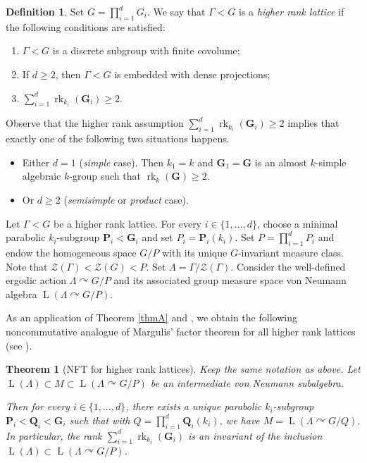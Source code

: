 \documentclass[JEP,XML,SOM,Unicode,published]{cedram}
\newenvironment{enumeratei}
{\bgroup\def\theenumi{\roman{enumi}}\def\theenumii{\arabic{enumii}}\begin{enumerate}}
{\end{enumerate}\egroup}
\newcommand{\bG}{\boldsymbol{G}}
\newcommand{\bP}{\boldsymbol{P}}
\newcommand{\bQ}{\boldsymbol{Q}}
\newtheorem{letterthm}{Theorem}
\theoremstyle{definition}
\newtheorem*{definition}{Definition}
\DeclareMathOperator{\rk}{rk}
\DeclareMathOperator{\rL}{L}
\begin{document}
\begin{definition}
Set $G = \prod_{i = 1}^d G_i$. We say that $\Gamma < G$ is a \emph{higher rank lattice} if the following conditions are satisfied:
\begin{enumeratei}
\item
$\Gamma < G$ is a discrete subgroup with finite covolume;
\item
If $d \geq 2$, then $\Gamma < G$ is embedded with dense projections;
\item
$\sum_{i = 1}^d \rk_{k_i}(\bG_i) \geq 2$.
\end{enumeratei}
\end{definition}

Observe that the higher rank assumption $\sum_{i = 1}^d \rk_{k_i}(\bG_i) \geq 2$ implies that exactly one of the following two situations happens.
\begin{itemize}
\item Either $d = 1$ (\emph{simple} case). Then $k_1 = k$ and $\bG_1 = \bG$ is an almost $k$-simple algebraic $k$-group such that $\rk_k(\bG) \geq 2$.
\item Or $d \geq 2$ (\emph{semisimple} or \emph{product} case).
\end{itemize}

Let $\Gamma < G$ be a higher rank lattice. For every $i \in \{1, \dots, d\}$, choose a minimal parabolic $k_i$-subgroup $\bP_i < \bG_i$ and set $P_i = \bP_i(k_i)$. Set $P = \prod_{i = 1}^d P_i$ and endow the homogeneous space $G/P$ with its unique $G$-invariant measure class. Note that $\mathscr Z(\Gamma) < \mathscr Z(G) < P$. Set $\Lambda = \Gamma/\mathscr Z(\Gamma)$. Consider the well-defined ergodic action $\Lambda \curvearrowright G/P$ and its associated group measure space von Neumann algebra $\rL(\Lambda \curvearrowright G/P)$.

As an application of Theorem \ref{thmA} and \cite[Th.\,D]{BBH21}, we obtain the following noncommutative analogue of Margulis'\! factor theorem for all higher rank lattices (see \cite[Th.\,IV.2.11]{Ma91}).

\begin{letterthm}[NFT for higher rank lattices]\label{thmB}
Keep the same notation as above. Let $\rL(\Lambda) \subset M \subset \rL(\Lambda \curvearrowright G/P)$ be an intermediate von Neumann subalgebra.

Then for every $i \in \{1, \dots, d\}$, there exists a unique parabolic $k_i$-subgroup $\bP_i < \bQ_i < \bG_i$ such that with $Q = \prod_{i = 1}^d \bQ_i(k_i)$, we have $M = \rL(\Lambda \curvearrowright G/Q)$. In particular, the rank $\sum_{i = 1}^d \rk_{k_i}(\bG_i)$ is an invariant of the inclusion $\rL(\Lambda) \subset \rL(\Lambda \curvearrowright G/P)$.
\end{letterthm}
\end{document}
